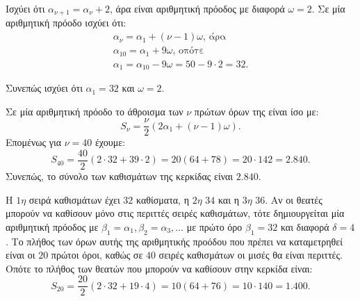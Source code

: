 
\begin{alist}
\item Ισχύει ότι $\alpha_{\nu+1} = \alpha_\nu + 2$, άρα είναι αριθμητική πρόοδος με διαφορά $\omega=2$.
Σε μία αριθμητική πρόοδο ισχύει ότι:
\begin{gather*}
\alpha_\nu = \alpha_1 + (\nu - 1)\omega\text{, άρα} \\
\alpha_{10} = \alpha_1 + 9\omega\text{, οπότε} \\
\alpha_1 = \alpha_{10} - 9\omega = 50 - 9 \cdot 2 = 32.
\end{gather*}

Συνεπώς ισχύει ότι $\alpha_1 = 32$ και $\omega=2$.

\item Σε μία αριθμητική πρόοδο το άθροισμα των $\nu$ πρώτων όρων της είναι ίσο με:
\[S_\nu = \dfrac{\nu}{2}(2\alpha_1 + (\nu - 1)\omega).\]
Επομένως για $\nu = 40$ έχουμε:
\[S_{40} = \dfrac{40}{2}(2 \cdot 32 + 39 \cdot 2) = 20(64 + 78) = 20 \cdot 142 = 2.840.\]
Συνεπώς, το σύνολο των καθισμάτων της κερκίδας είναι $2.840$.

\item Η $1η$ σειρά καθισμάτων έχει $32$ καθίσματα, η $2η$ $34$ και η $3η$ $36$. Αν οι θεατές μπορούν να καθίσουν μόνο στις περιττές σειρές καθισμάτων, τότε δημιουργείται μία αριθμητική πρόοδος με $\beta_1 = \alpha_1 , \beta_2 = \alpha_3 , \dots$ με πρώτο όρο $\beta_1 = 32$ και διαφορά $\delta = 4$.
Το πλήθος των όρων αυτής της αριθμητικής προόδου που πρέπει να καταμετρηθεί είναι οι $20$ πρώτοι όροι, καθώς σε $40$ σειρές καθισμάτων οι μισές θα είναι περιττές.
Οπότε το πλήθος των θεατών που μπορούν να καθίσουν στην κερκίδα είναι:
\[S_{20} = \dfrac{20}{2}(2 \cdot 32 + 19 \cdot 4) = 10(64 + 76) = 10 \cdot 140 = 1.400.\]
\end{alist}

